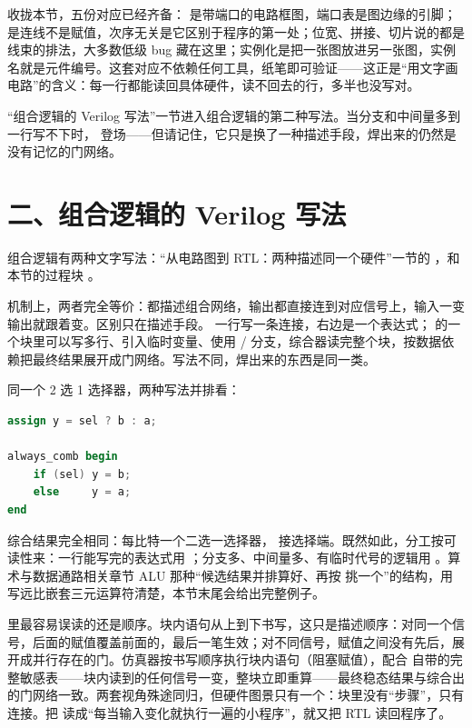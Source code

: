收拢本节，五份对应已经齐备： 是带端口的电路框图，端口表是图边缘的引脚； 是连线不是赋值，次序无关是它区别于程序的第一处；位宽、拼接、切片说的都是线束的排法，大多数低级 bug 藏在这里；实例化是把一张图放进另一张图，实例名就是元件编号。这套对应不依赖任何工具，纸笔即可验证——这正是“用文字画电路”的含义：每一行都能读回具体硬件，读不回去的行，多半也没写对。

“组合逻辑的 Verilog 写法”一节进入组合逻辑的第二种写法。当分支和中间量多到  一行写不下时， 登场——但请记住，它只是换了一种描述手段，焊出来的仍然是没有记忆的门网络。

\section{二、组合逻辑的 Verilog 写法}

组合逻辑有两种文字写法：“从电路图到 RTL：两种描述同一个硬件”一节的 ，和本节的过程块 。

机制上，两者完全等价：都描述组合网络，输出都直接连到对应信号上，输入一变输出就跟着变。区别只在描述手段。 一行写一条连接，右边是一个表达式； 的一个块里可以写多行、引入临时变量、使用 / 分支，综合器读完整个块，按数据依赖把最终结果展开成门网络。写法不同，焊出来的东西是同一类。

同一个 2 选 1 选择器，两种写法并排看：

\begin{lstlisting}[language=Verilog]
assign y = sel ? b : a;

always_comb begin
    if (sel) y = b;
    else     y = a;
end
\end{lstlisting}

综合结果完全相同：每比特一个二选一选择器， 接选择端。既然如此，分工按可读性来：一行能写完的表达式用 ；分支多、中间量多、有临时代号的逻辑用 。算术与数据通路相关章节 ALU 那种“候选结果并排算好、再按  挑一个”的结构，用  写远比嵌套三元运算符清楚，本节末尾会给出完整例子。

 里最容易误读的还是顺序。块内语句从上到下书写，这只是描述顺序：对同一个信号，后面的赋值覆盖前面的，最后一笔生效；对不同信号，赋值之间没有先后，展开成并行存在的门。仿真器按书写顺序执行块内语句（阻塞赋值），配合  自带的完整敏感表——块内读到的任何信号一变，整块立即重算——最终稳态结果与综合出的门网络一致。两套视角殊途同归，但硬件图景只有一个：块里没有“步骤”，只有连接。把  读成“每当输入变化就执行一遍的小程序”，就又把 RTL 读回程序了。

